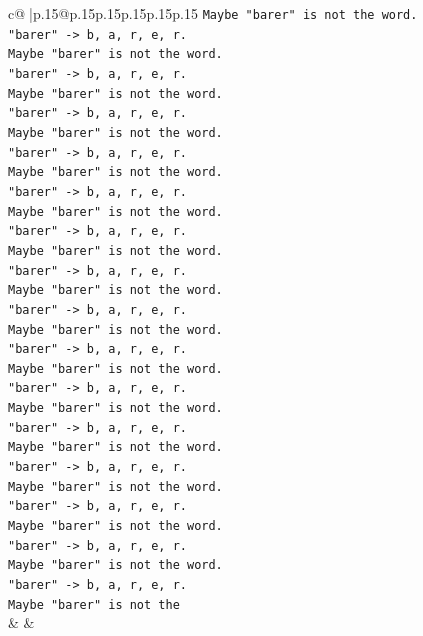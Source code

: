 \documentclass{article}
\begin{document}
{\begin{supertabular}{c@{$\;$}|p{.15\linewidth}@{}p{.15\linewidth}p{.15\linewidth}p{.15\linewidth}p{.15\linewidth}p{.15\linewidth}}
{{{\texttt{Maybe "barer" is not the word.} \\
\texttt{"barer" {-}> b, a, r, e, r.} \\
\texttt{Maybe "barer" is not the word.} \\
\texttt{"barer" {-}> b, a, r, e, r.} \\
\texttt{Maybe "barer" is not the word.} \\
\texttt{"barer" {-}> b, a, r, e, r.} \\
\texttt{Maybe "barer" is not the word.} \\
\texttt{"barer" {-}> b, a, r, e, r.} \\
\texttt{Maybe "barer" is not the word.} \\
\texttt{"barer" {-}> b, a, r, e, r.} \\
\texttt{Maybe "barer" is not the word.} \\
\texttt{"barer" {-}> b, a, r, e, r.} \\
\texttt{Maybe "barer" is not the word.} \\
\texttt{"barer" {-}> b, a, r, e, r.} \\
\texttt{Maybe "barer" is not the word.} \\
\texttt{"barer" {-}> b, a, r, e, r.} \\
\texttt{Maybe "barer" is not the word.} \\
\texttt{"barer" {-}> b, a, r, e, r.} \\
\texttt{Maybe "barer" is not the word.} \\
\texttt{"barer" {-}> b, a, r, e, r.} \\
\texttt{Maybe "barer" is not the word.} \\
\texttt{"barer" {-}> b, a, r, e, r.} \\
\texttt{Maybe "barer" is not the word.} \\
\texttt{"barer" {-}> b, a, r, e, r.} \\
\texttt{Maybe "barer" is not the word.} \\
\texttt{"barer" {-}> b, a, r, e, r.} \\
\texttt{Maybe "barer" is not the word.} \\
\texttt{"barer" {-}> b, a, r, e, r.} \\
\texttt{Maybe "barer" is not the word.} \\
\texttt{"barer" {-}> b, a, r, e, r.} \\
\texttt{Maybe "barer" is not the} \\
            }
        }
    }
    & & \\ \\


\end{supertabular}}
\end{document}
